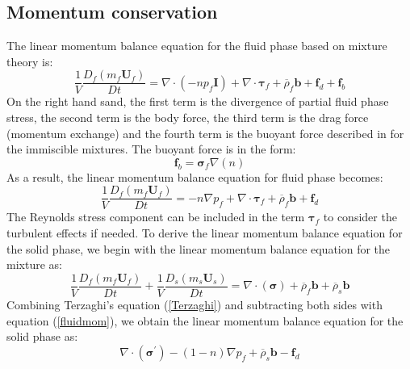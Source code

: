 \documentclass[preprint,12pt]{elsarticle}
\begin{document}
\subsection{\textsf{Momentum conservation}}
\label{Momentum}
%
%
The linear momentum balance equation for the fluid phase based on mixture theory is:\\
%
%
\begin{equation}
    \frac{1}{V}\frac{D_f(m_f \pmb{U}_f)}{Dt} = 
    \nabla \cdot (-np_f\pmb{I}) + \nabla \cdot \pmb{\tau}_f + \overline{\rho}_f \pmb{b} + \pmb{f}_{d} + \pmb{f}_b
\end{equation}
%
%
On the right hand sand, the first term is the divergence of partial fluid phase stress, the second term is the body force, the third term is the drag force (momentum exchange) and the fourth term is the buoyant force described in \cite{DRUMHELLER} for the immiscible mixtures. The buoyant force is in the form:\\
%
%
\begin{equation}
    \pmb{f}_b = \pmb{\sigma}_f\nabla (n)
\end{equation}
%
%
As a result, the linear momentum balance equation for fluid phase becomes:
%
%
\begin{equation}
    \label{fluidmom}
     \frac{1}{V}\frac{D_f(m_f \pmb{U}_f)}{Dt} = -n\nabla p_f + \nabla \cdot \pmb{\tau}_f + 
   \overline{\rho}_f \pmb{b} +
     \pmb{f}_{d}
\end{equation}
%
%
The Reynolds stress component can be included in the term $\pmb{\tau}_f$ to consider the turbulent effects if needed. To derive the linear momentum balance equation for the solid phase, we begin with the linear momentum balance equation for the mixture as:
%
%
\begin{equation}
    \label{totalmom}
     \frac{1}{V}\frac{D_f(m_f \pmb{U}_f)}{Dt}
    +  \frac{1}{V}\frac{D_s(m_s \pmb{U}_s)}{Dt} = 
    \nabla \cdot (\pmb{\sigma}) + \overline{\rho}_f \pmb{b} 
    + \overline{\rho}_s \pmb{b}
\end{equation}
%
%
Combining Terzaghi's equation (\ref{Terzaghi}) and subtracting both sides with equation (\ref{fluidmom}), we obtain the linear momentum balance equation for the solid phase as:
%
%
\begin{equation}
    \label{solidmom}
    \nabla \cdot (\pmb{\sigma}^\prime) - (1-n) \nabla p_f 
    + \overline{\rho}_s \pmb{b}
    - \pmb{f}_{d}
\end{equation}
%
%
\end{document}
